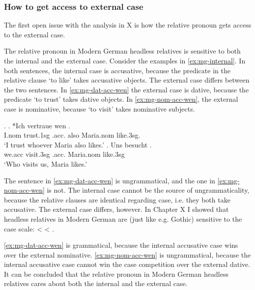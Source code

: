 \subsubsection{How to get access to external case}

The first open issue with the analysis in X is how the relative pronoun gets access to the external case.

The relative pronoun in Modern German headless relatives is sensitive to both the internal and the external case. Consider the examples in \ref{ex:mg-internal}. In both sentences, the internal case is accusative, because the predicate in the relative clause  `to like' takes accusative objects. The external case differs between the two sentences. In \ref{ex:mg-dat-acc-wen} the external case is dative, because the predicate  `to trust' takes dative objects.  In \ref{ex:mg-nom-acc-wen}, the external case is nominative, because  `to visit' takes nominative subjects.

\ex.\label{ex:mg-internal}
\ag. *Ich vertraue wen   . \\
I.\ac{nom} trust.1\ac{sg}\scsub{[dat]} .\ac{acc}. also Maria.\ac{nom} like.3\ac{sg}\scsub{[acc]}.\\
`I trust whoever Maria also likes.' \label{ex:mg-dat-acc-wen}
\bg. Uns besucht   .\\
 we.\ac{acc} visit.3\ac{sg}\scsub{[nom]} .\ac{acc}. Maria.\ac{nom} like.3\ac{sg}\scsub{[acc]}\\
 `Who visits us, Maria likes.' \label{ex:mg-nom-acc-wen}

The sentence in \ref{ex:mg-dat-acc-wen} is ungrammatical, and the one in \ref{ex:mg-nom-acc-wen} is not. The internal case cannot be the source of ungrammaticality, because the relative clauses are identical regarding case, i.e. they both take accusative. The external case differs, however. In Chapter X I showed that headless relatives in Modern German are (just like e.g. Gothic) sensitive to the case scale:  <  < .

\ref{ex:mg-dat-acc-wen} is grammatical, because the internal accusative case wins over the external nominative. \ref{ex:mg-nom-acc-wen} is ungrammatical, because the internal accusative case cannot win the case competition over the external dative. It can be concluded that the relative pronoun in Modern German headless relatives cares about both the internal and the external case.

